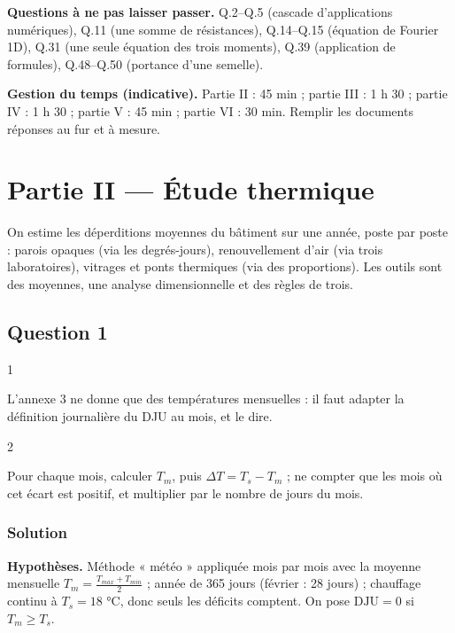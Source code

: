 \documentclass[11pt,a4paper]{article}
\begin{document}
\textbf{Questions à ne pas laisser passer.} Q.2--Q.5 (cascade d'applications numériques), Q.11 (une somme de résistances), Q.14--Q.15 (équation de Fourier 1D), Q.31 (une seule équation des trois moments), Q.39 (application de formules), Q.48--Q.50 (portance d'une semelle).

\textbf{Gestion du temps (indicative).} Partie II : 45 min ; partie III : 1 h 30 ; partie IV : 1 h 30 ; partie V : 45 min ; partie VI : 30 min. Remplir les documents réponses au fur et à mesure.

\hypertarget{partie-ii-uxe9tude-thermique}{%
\section{Partie II --- Étude thermique}\label{partie-ii-uxe9tude-thermique}}

On estime les déperditions moyennes du bâtiment sur une année, poste par poste : parois opaques (via les degrés-jours), renouvellement d'air (via trois laboratoires), vitrages et ponts thermiques (via des proportions). Les outils sont des moyennes, une analyse dimensionnelle et des règles de trois.

\hypertarget{question-1}{%
\subsection{Question 1}\label{question-1}}

\begin{indication}{1}

L'annexe 3 ne donne que des températures mensuelles : il faut adapter la définition journalière du DJU au mois, et le dire.

\end{indication}

\begin{indication}{2}

Pour chaque mois, calculer \(T_m\), puis \(\Delta T=T_s-T_m\) ; ne compter que les mois où cet écart est positif, et multiplier par le nombre de jours du mois.

\end{indication}

\hypertarget{solution}{%
\subsubsection{Solution}\label{solution}}

\textbf{Hypothèses.} Méthode « météo » appliquée mois par mois avec la moyenne mensuelle \(T_m=\frac{T_{max}+T_{min}}{2}\) ; année de 365 jours (février : 28 jours) ; chauffage continu à \(T_s=18\) °C, donc seuls les déficits comptent. On pose \(\text{DJU}=0\) si \(T_m\ge T_s\).
\end{document}
